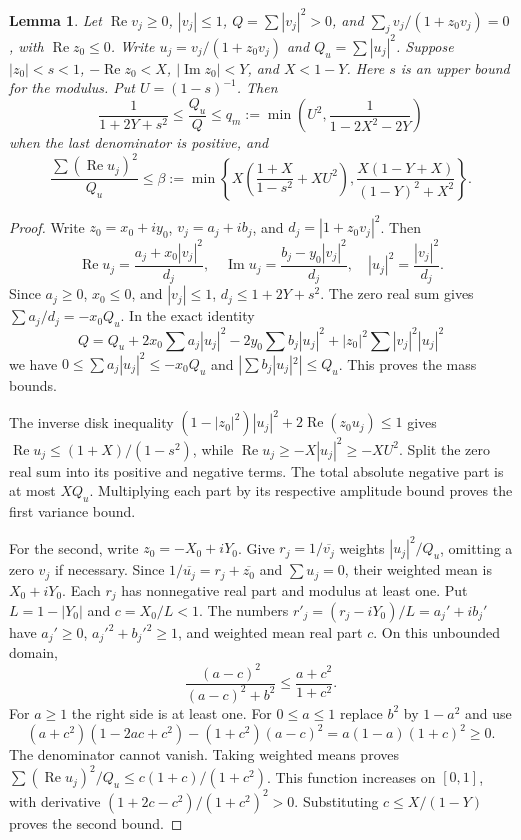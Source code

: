 \documentclass[11pt,reqno]{amsart}
\numberwithin{equation}{section}
\newtheorem{lemma}[theorem]{Lemma}
\theoremstyle{definition}
\theoremstyle{remark}
\renewcommand{\Re}{\operatorname{Re}}
\renewcommand{\Im}{\operatorname{Im}}
\begin{document}
\begin{lemma}\label{mf:saddle-variance}
Let $\Re v_j\ge0$, $|v_j|\le1$, $Q=\sum|v_j|^2>0$, and
$\sum_jv_j/(1+z_0v_j)=0$, with $\Re z_0\le0$.
Write $u_j=v_j/(1+z_0v_j)$ and $Q_u=\sum|u_j|^2$.
Suppose $|z_0|<s<1$, $-\Re z_0<X$, $|\Im z_0|<Y$,
and $X<1-Y$. Here $s$ is an upper bound for the modulus.
Put $U=(1-s)^{-1}$.
Then
\[
 \frac1{1+2Y+s^2}\le\frac{Q_u}{Q}
 \le q_m:=\min\left(U^2,\frac1{1-2X^2-2Y}\right)
\]
when the last denominator is positive, and
\[
 \frac{\sum(\Re u_j)^2}{Q_u}\le\beta
 :=\min\left\{
 X\left(\frac{1+X}{1-s^2}+XU^2\right),
 \frac{X(1-Y+X)}{(1-Y)^2+X^2}\right\}.
\]
\end{lemma}
\begin{proof}
Write $z_0=x_0+iy_0$, $v_j=a_j+ib_j$, and
$d_j=|1+z_0v_j|^2$. Then
\[
 \Re u_j=\frac{a_j+x_0|v_j|^2}{d_j},\quad
 \Im u_j=\frac{b_j-y_0|v_j|^2}{d_j},\quad
 |u_j|^2=\frac{|v_j|^2}{d_j}.
\]
Since $a_j\ge0$, $x_0\le0$, and $|v_j|\le1$,
$d_j\le1+2Y+s^2$. The zero real sum gives
$\sum a_j/d_j=-x_0Q_u$. In the exact identity
\[
 Q=Q_u+2x_0\sum a_j|u_j|^2
       -2y_0\sum b_j|u_j|^2
       +|z_0|^2\sum|v_j|^2|u_j|^2
\]
we have $0\le\sum a_j|u_j|^2\le-x_0Q_u$ and
$|\sum b_j|u_j|^2|\le Q_u$. This proves the mass bounds.

The inverse disk inequality
$(1-|z_0|^2)|u_j|^2+2\Re(z_0u_j)\le1$ gives
$\Re u_j\le(1+X)/(1-s^2)$, while
$\Re u_j\ge-X|u_j|^2\ge-XU^2$.
Split the zero real sum into its positive and negative terms.
The total absolute negative part is at most $XQ_u$. Multiplying
each part by its respective amplitude bound proves the first
variance bound.

For the second, write $z_0=-X_0+iY_0$. Give
$r_j=1/\overline{v_j}$ weights $|u_j|^2/Q_u$, omitting a
zero $v_j$ if necessary. Since
$1/\overline{u_j}=r_j+\overline{z_0}$ and $\sum u_j=0$,
their weighted mean is $X_0+iY_0$. Each $r_j$ has nonnegative
real part and modulus at least one. Put $L=1-|Y_0|$ and
$c=X_0/L<1$. The numbers
$r'_j=(r_j-iY_0)/L=a_j'+ib_j'$ have $a_j'\ge0$,
$a_j'^2+b_j'^2\ge1$, and weighted mean real part $c$.
On this unbounded domain,
\[
 \frac{(a-c)^2}{(a-c)^2+b^2}\le\frac{a+c^2}{1+c^2}.
\]
For $a\ge1$ the right side is at least one. For $0\le a\le1$
replace $b^2$ by $1-a^2$ and use
\[
 (a+c^2)(1-2ac+c^2)-(1+c^2)(a-c)^2
 =a(1-a)(1+c)^2\ge0.
\]
The denominator cannot vanish. Taking weighted means proves
$\sum(\Re u_j)^2/Q_u\le c(1+c)/(1+c^2)$.
This function increases on $[0,1]$, with derivative
$(1+2c-c^2)/(1+c^2)^2>0$. Substituting $c\le X/(1-Y)$
proves the second bound.
\end{proof}
\end{document}
